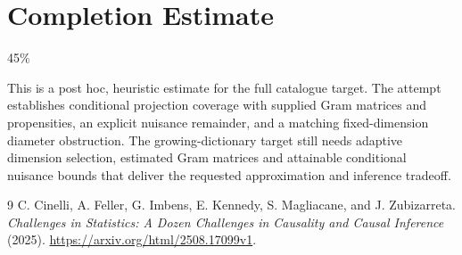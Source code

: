 \documentclass[11pt]{article}
\theoremstyle{remark}
\begin{document}
\section{Completion Estimate}
45\%

This is a post hoc, heuristic estimate for the full catalogue target.
The attempt establishes conditional projection coverage with supplied Gram matrices and propensities, an explicit nuisance remainder, and a matching fixed-dimension diameter obstruction. The growing-dictionary target still needs adaptive dimension selection, estimated Gram matrices and attainable conditional nuisance bounds that deliver the requested approximation and inference tradeoff.

\begin{thebibliography}{9}
 C. Cinelli, A. Feller, G. Imbens, E. Kennedy, S. Magliacane, and J. Zubizarreta. \emph{Challenges in Statistics: A Dozen Challenges in Causality and Causal Inference} (2025). \url{https://arxiv.org/html/2508.17099v1}.
\end{thebibliography}
\end{document}
